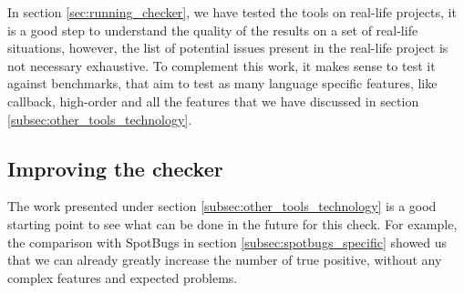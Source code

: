 In section \ref{sec:running_checker}, we have tested the tools on real-life projects, it is a good step to understand the quality of the results on a set of real-life situations, however, the list of potential issues present in the real-life project is not necessary exhaustive. 
To complement this work, it makes sense to test it against benchmarks, that aim to test as many language specific features, like callback, high-order and all the features that we have discussed in section \ref{subsec:other_tools_technology}.

\subsection{Improving the checker}
\label{subsec:other_tools}

The work presented under section \ref{subsec:other_tools_technology} is a good starting point to see what can be done in the future for this check. 
For example, the comparison with SpotBugs in section \ref{subsec:spotbugs_specific} showed us that we can already greatly increase the number of true positive, without any complex features and expected problems.